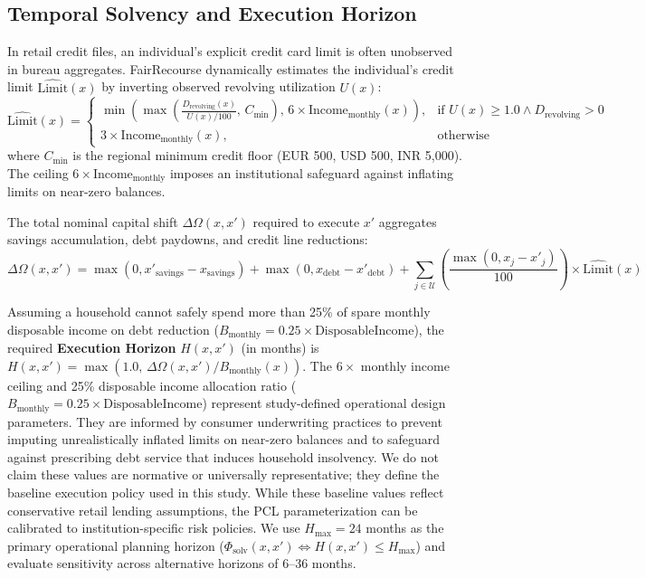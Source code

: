 \documentclass[manuscript,screen,review,anonymous]{acmart}
\begin{document}
\subsection{Temporal Solvency and Execution Horizon}
In retail credit files, an individual's explicit credit card limit is often unobserved in bureau aggregates. FairRecourse dynamically estimates the individual's credit limit $\widehat{\text{Limit}}(x)$ by inverting observed revolving utilization $U(x)$:
\begin{equation}
\widehat{\text{Limit}}(x) = \begin{cases}
\min\left(\max\left(\frac{D_{\text{revolving}}(x)}{U(x) / 100}, \, C_{\min}\right), \, 6 \times \text{Income}_{\text{monthly}}(x)\right), & \text{if } U(x) \ge 1.0 \land D_{\text{revolving}} > 0 \\
3 \times \text{Income}_{\text{monthly}}(x), & \text{otherwise}
\end{cases}
\end{equation}
where $C_{\min}$ is the regional minimum credit floor (EUR 500, USD 500, INR 5,000). The ceiling $6 \times \text{Income}_{\text{monthly}}$ imposes an institutional safeguard against inflating limits on near-zero balances.

The total nominal capital shift $\Delta \Omega(x, x')$ required to execute $x'$ aggregates savings accumulation, debt paydowns, and credit line reductions:
\begin{equation}
\Delta \Omega(x, x') = \max(0, x'_{\text{savings}} - x_{\text{savings}}) + \max(0, x_{\text{debt}} - x'_{\text{debt}}) + \sum_{j \in \mathcal{U}} \left( \frac{\max(0, x_j - x'_j)}{100} \right) \times \widehat{\text{Limit}}(x)
\end{equation}

Assuming a household cannot safely spend more than 25\% of spare monthly disposable income on debt reduction ($B_{\text{monthly}} = 0.25 \times \text{DisposableIncome}$), the required \textbf{Execution Horizon} $H(x, x')$ (in months) is $H(x, x') = \max\left(1.0, \, \Delta \Omega(x, x') / B_{\text{monthly}}(x)\right)$.
The $6\times$ monthly income ceiling and 25\% disposable income allocation ratio ($B_{\text{monthly}} = 0.25 \times \text{DisposableIncome}$) represent study-defined operational design parameters. They are informed by consumer underwriting practices to prevent imputing unrealistically inflated limits on near-zero balances and to safeguard against prescribing debt service that induces household insolvency. We do not claim these values are normative or universally representative; they define the baseline execution policy used in this study. While these baseline values reflect conservative retail lending assumptions, the PCL parameterization can be calibrated to institution-specific risk policies. We use $H_{\max} = 24$ months as the primary operational planning horizon ($\Phi_{\text{solv}}(x, x') \iff H(x, x') \le H_{\max}$) and evaluate sensitivity across alternative horizons of 6--36 months.
\end{document}
